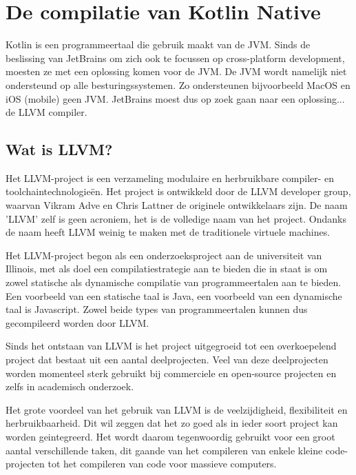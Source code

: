 
\chapter{De compilatie van Kotlin Native}
\label{ch:compiler}
Kotlin is een programmeertaal die gebruik maakt van de JVM. Sinds de beslissing van JetBrains om zich ook te focussen op cross-platform development, moesten ze met een oplossing komen voor de JVM. De JVM wordt namelijk niet ondersteund op alle besturingssystemen. Zo ondersteunen bijvoorbeeld MacOS en iOS (mobile) geen JVM. JetBrains moest dus op zoek gaan naar een oplossing... de LLVM compiler.

\section{Wat is LLVM?}
Het LLVM-project is een verzameling modulaire en herbruikbare compiler- en toolchaintechnologieën. Het project is ontwikkeld door de LLVM developer group, waarvan Vikram Adve en Chris Lattner de originele ontwikkelaars zijn. De naam 'LLVM' zelf is geen acroniem, het is de volledige naam van het project. Ondanks de naam heeft LLVM weinig te maken met de traditionele virtuele machines.

Het LLVM-project begon als een onderzoeksproject aan de universiteit van Illinois, met als doel een compilatiestrategie aan te bieden die in staat is om zowel statische als dynamische compilatie van programmeertalen aan te bieden. Een voorbeeld van een statische taal is Java, een voorbeeld van een dynamische taal is Javascript. Zowel beide types van programmeertalen kunnen dus gecompileerd worden door LLVM.

Sinds het ontstaan van LLVM is het project uitgegroeid tot een overkoepelend project dat bestaat uit een aantal deelprojecten. Veel van deze deelprojecten worden momenteel sterk gebruikt bij commerciele en open-source projecten en zelfs in academisch onderzoek.

Het grote voordeel van het gebruik van LLVM is de veelzijdigheid, flexibiliteit en herbruikbaarheid. Dit wil zeggen dat het zo goed als in ieder soort project kan worden geintegreerd. Het wordt daarom tegenwoordig gebruikt voor een groot aantal verschillende taken, dit gaande van het compileren van enkele kleine code-projecten tot het compileren van code voor massieve computers.

